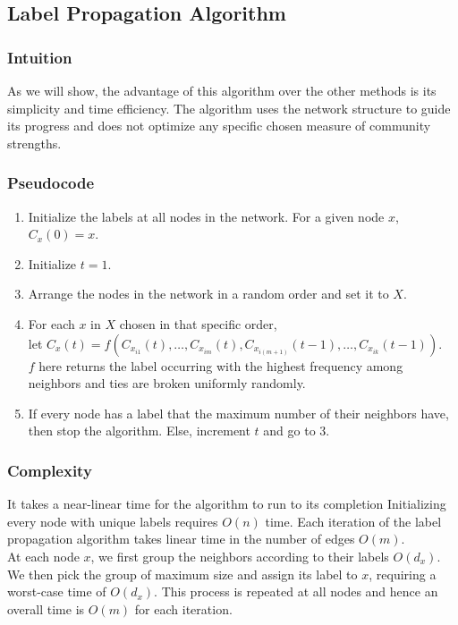 \subsection{Label Propagation Algorithm}
\subsubsection{Intuition}
As we will show, the advantage of this algorithm over the other methods is its simplicity and time efficiency. The algorithm uses the network structure to guide its progress and does not optimize any specific chosen measure of community strengths.
\subsubsection{Pseudocode}
\begin{enumerate}
    \item Initialize the labels at all nodes in the network. For a given node $x$, $C_{x}(0) = x$.
    \item Initialize $t = 1$.
    \item Arrange the nodes in the network in a random order and set it to $X$.
    \item For each $x$ in $X$ chosen in that specific order,\\
         let $C_{x}(t) = f(C_{x_{i1}}(t),\ldots,C_{x_{im}}(t),C_{x_{i(m+1)}}(t-1),\ldots,C_{x_{ik}}(t-1))$.\\
         $f$ here returns the label occurring with the highest frequency among neighbors and ties are broken uniformly randomly.
    \item If every node has a label that the maximum number of their neighbors have, then stop the algorithm. Else, increment $t$ and go to 3.
\end{enumerate}
\subsubsection{Complexity}
It takes a near-linear time for the algorithm to run to its completion Initializing every node with unique labels requires $O(n)$ time. Each iteration of the label propagation algorithm takes linear time in the number of edges $O(m)$.\\
At each node $x$, we first group the neighbors according to their labels $O(d_{x})$. We then pick the group of maximum size and assign its label to $x$, requiring a worst-case time of $O(d_{x})$. This process is repeated at all nodes and hence an overall time is $O(m)$ for each iteration.
